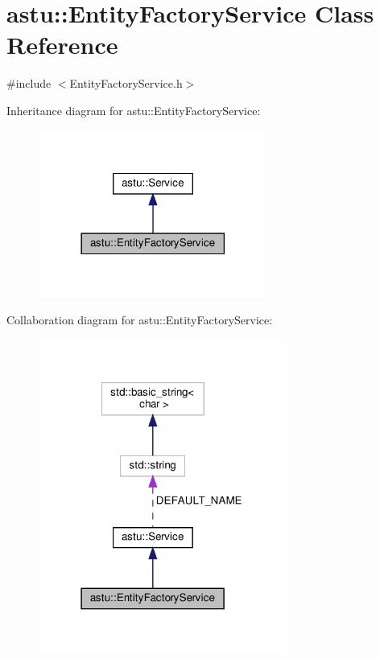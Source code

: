 \hypertarget{classastu_1_1EntityFactoryService}{}\section{astu\+:\+:Entity\+Factory\+Service Class Reference}
\label{classastu_1_1EntityFactoryService}


{\ttfamily \#include $<$Entity\+Factory\+Service.\+h$>$}



Inheritance diagram for astu\+:\+:Entity\+Factory\+Service\+:\nopagebreak
\begin{figure}[H]
\begin{center}
\leavevmode
\includegraphics[width=213pt]{classastu_1_1EntityFactoryService__inherit__graph}
\end{center}
\end{figure}


Collaboration diagram for astu\+:\+:Entity\+Factory\+Service\+:\nopagebreak
\begin{figure}[H]
\begin{center}
\leavevmode
\includegraphics[width=231pt]{classastu_1_1EntityFactoryService__coll__graph}
\end{center}
\end{figure}

